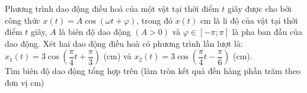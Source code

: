 \begin{ex}%
	Phương trình dao động điều hoà của một vật tại thời  điểm $t$ giây được cho bởi công thức $x(t)=A\cos \left(\omega t+\varphi \right)$, trong đó $x(t)$ cm là li độ của vật tại thời điểm $t$ giây, $A$ là biên độ dao động $\left(A> 0\right)$ và $\varphi \in \left[-\pi;\pi \right]$ là pha ban đầu của dao động. Xét hai dao động điều hoà có phương trình lần lượt là:
	$x_1  (t)=3\cos \left(\dfrac{\pi}{4} t+\dfrac{\pi}{3} \right)$ (cm) và $x_2 (t)=3\cos \left(\dfrac{\pi}{4} t-\dfrac{\pi}{6} \right)$ (cm).
	 \\
	Tìm biên  độ dao động tổng hợp trên (làm tròn kết quả đến hàng phần trăm theo đơn vị cm) 
\end{ex}

